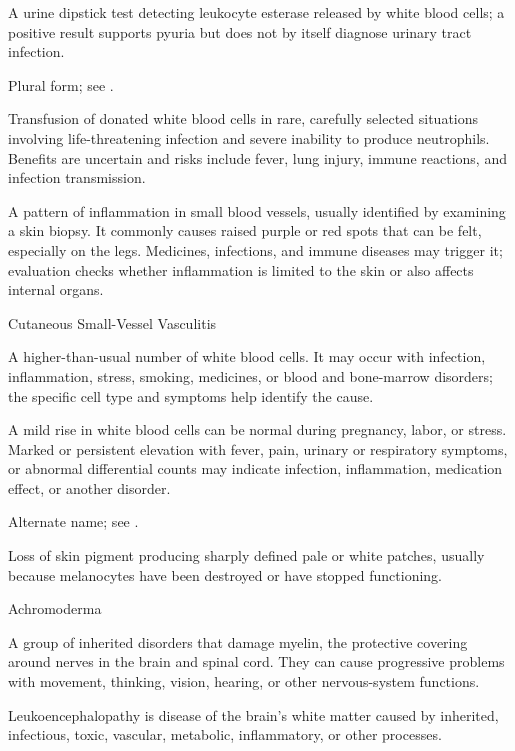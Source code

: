  A urine dipstick test detecting leukocyte esterase released by white blood cells; a positive result supports pyuria but does not by itself diagnose urinary tract infection.

 Plural form; see .

 Transfusion of donated white blood cells in rare, carefully selected situations involving life-threatening infection and severe inability to produce neutrophils. Benefits are uncertain and risks include fever, lung injury, immune reactions, and infection transmission.

 A pattern of inflammation in small blood vessels, usually identified by examining a skin biopsy. It commonly causes raised purple or red spots that can be felt, especially on the legs. Medicines, infections, and immune diseases may trigger it; evaluation checks whether inflammation is limited to the skin or also affects internal organs.

\synonyms
Cutaneous Small-Vessel Vasculitis

 A higher-than-usual number of white blood cells. It may occur with infection, inflammation, stress, smoking, medicines, or blood and bone-marrow disorders; the specific cell type and symptoms help identify the cause.

 A mild rise in white blood cells can be normal during pregnancy, labor, or stress. Marked or persistent elevation with fever, pain, urinary or respiratory symptoms, or abnormal differential counts may indicate infection, inflammation, medication effect, or another disorder.

 Alternate name; see .

 Loss of skin pigment producing sharply defined pale or white patches, usually because melanocytes have been destroyed or have stopped functioning.

\synonyms
Achromoderma

 A group of inherited disorders that damage myelin, the protective covering around nerves in the brain and spinal cord. They can cause progressive problems with movement, thinking, vision, hearing, or other nervous-system functions.

 Leukoencephalopathy is disease of the brain’s white matter caused by inherited, infectious, toxic, vascular, metabolic, inflammatory, or other processes.

